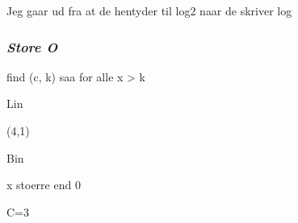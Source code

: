 \documentclass{article}
\begin{document}
\begin{Maple Normal}{
}\end{Maple Normal}
\begin{Maple Normal}{
Jeg gaar ud fra at de hentyder til log2 naar de skriver log\linebreak
}\end{Maple Normal}

\subsubsection{\textit{Store O}}
\begin{Maple Normal}{
}\end{Maple Normal}
\begin{Maple Normal}{
find (c, k) saa 
 for alle x > k}\end{Maple Normal}

\begin{Maple Normal}{
}\end{Maple Normal}
\begin{Maple Normal}{
Lin}\end{Maple Normal}

\begin{Maple Normal}{
}\end{Maple Normal}
\begin{Maple Normal}{
(4,1)}\end{Maple Normal}

\begin{Maple Normal}{
}\end{Maple Normal}
\begin{Maple Normal}{
Bin}\end{Maple Normal}

\begin{Maple Normal}{
}\end{Maple Normal}
\begin{Maple Normal}{
x stoerre end 0}\end{Maple Normal}

\begin{Maple Normal}{
}\end{Maple Normal}
\begin{Maple Normal}{
C=3}\end{Maple Normal}
\end{document}
